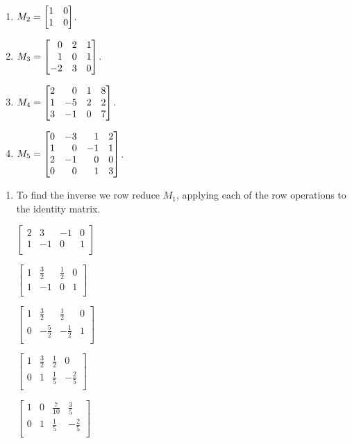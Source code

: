 \begin{exercises}
\begin{problist}
\begin{enumerate}
			\item $M_{2} = \mat{1&0\\1&0}$.

			\item $M_{3} = \mat{0&2&1\\1&0&1\\-2&3&0}$.

			\item $M_{4} = \mat{2&0&1&8\\1&-5&2&2\\3&-1&0&7}$.

			\item $M_{5} = \mat{0&-3&1&2\\1&0&-1&1\\2&-1&0&0\\0&0&1&3}$.
		\end{enumerate}

		\begin{solution}
	    \begin{enumerate}
				\item
				To find the inverse we row reduce $M_{1}$, applying each
				of the row operations to the identity matrix.

				$\left[\begin{array}{cc|cc}
							2&3&-1&0\\
							1&-1&0&1\\
							\end{array}\right]$

				$\left[\begin{array}{cc|cc}
							1&\frac{3}{2}&\frac{1}{2}&0\\
							1&-1&0&1\\
							\end{array}\right]$

				$\left[\begin{array}{cc|cc}
							1&\frac{3}{2}&\frac{1}{2}&0\\
							0&-\frac{5}{2}&-\frac{1}{2}&1\\
							\end{array}\right]$

				$\left[\begin{array}{cc|cc}
							1&\frac{3}{2}&\frac{1}{2}&0\\
							0&1&\frac{1}{5}&-\frac{2}{5}\\
							\end{array}\right]$

				$\left[\begin{array}{cc|cc}
							1&0&\frac{7}{10}&\frac{3}{5}\\
							0&1&\frac{1}{5}&-\frac{2}{5}\\
							\end{array}\right]$


\end{enumerate}
\end{solution}
\end{problist}
\end{exercises}
